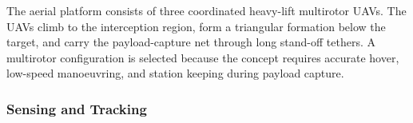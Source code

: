 The aerial platform consists of three coordinated heavy-lift multirotor UAVs. The UAVs climb to the interception region, form a triangular formation below the target, and carry the payload-capture net through long stand-off tethers. A multirotor configuration is selected because the concept requires accurate hover, low-speed manoeuvring, and station keeping during payload capture.


\subsubsection{Sensing and Tracking}


                                                                                   






